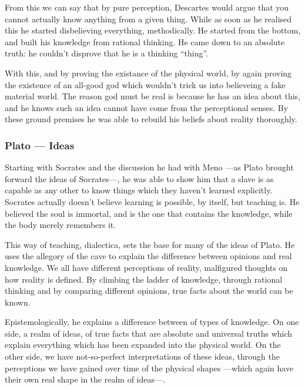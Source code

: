 \documentclass{article}
\begin{document}
		From this we can say that by pure perception, Descartes would argue that you cannot actually know anything from a given thing. While as soon as he realised this he started disbelieving everything, methodically. He started from the bottom, and built his knowledge from rational thinking. He came down to an absolute truth: he couldn't disprove that he is a thinking ``thing''. 
		
		With this, and by proving the existance of the physical world, by again proving the existence of an all-good god which wouldn't trick us into believeing a fake material world. The reason god must be real is because he has an idea about this, and he knows such an idea cannot have come from the perceptional senses. By these ground premises he was able to rebuild his beliefs about reality thoroughly.

	\vspace*{1in}
	\subsubsection*{Plato --- Ideas}
		Starting with Socrates and the discussion he had with Meno ---as Plato brought forward the ideas of Socrates---, he was able to show him that a slave is as capable as any other to know things which they haven't learned explicitly. Socrates actually doesn't believe learning is possible, by itself, but teaching is. He believed the soul is immortal, and is the one that contains the knowledge, while the body merely remembers it.
		
		This way of teaching, dialectica, sets the base for many of the ideas of Plato. He uses the allegory of the cave to explain the difference between opinions and real knowledge. We all have different perceptions of reality, malfigured thoughts on how reality is defined. By climbing the ladder of knowledge, through rational thinking and by comparing different opinions, true facts about the world can be known. 

		Epistemologically, he explains a difference between of types of knowledge. On one side, a realm of ideas, of true facts that are absolute and universal truths which explain everything which has been expanded into the physical world. On the other side, we have not-so-perfect interpretations of these ideas, through the perceptions we have gained over time of the physical shapes ---which again have their own real shape in the realm of ideas---. 

\vspace*{1in}
\end{document}
